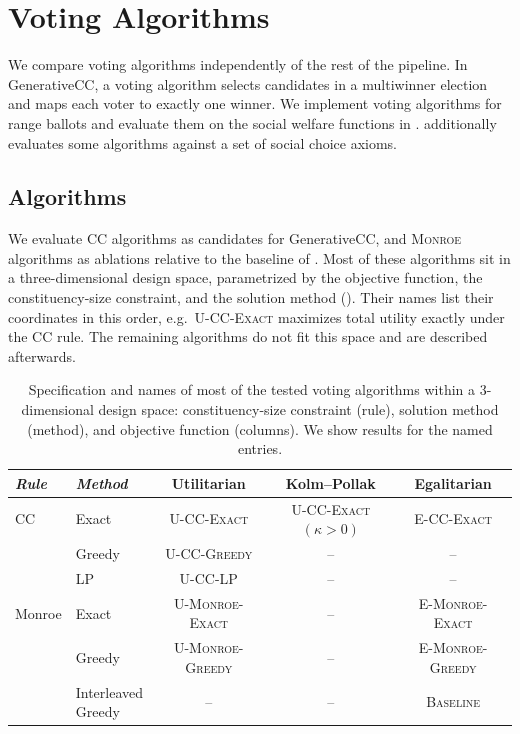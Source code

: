\documentclass[letterpaper]{article} %
\newcommand{\Exact}{\textsc{U-CC-Exact}}
\newcommand{\ExactP}{\textsc{U-CC-Exact}$(\kappa>0)$}
\newcommand{\Greedy}{\textsc{U-CC-Greedy}}
\newcommand{\LP}{\textsc{U-CC-LP}}
\newcommand{\ExactMonroe}{\textsc{U-Monroe-Exact}}
\newcommand{\EExactMonroe}{\textsc{E-Monroe-Exact}}
\newcommand{\Baseline}{\textsc{Baseline}}
\newcommand{\ECCExact}{\textsc{E-CC-Exact}}
\newcommand{\GreedyMonroe}{\textsc{E-Monroe-Greedy}}
\newcommand{\UGreedyMonroe}{\textsc{U-Monroe-Greedy}}
\begin{document}
\section{Voting Algorithms}
\label{sec:voting-algorithms}

We compare voting algorithms independently of the rest of the pipeline.
In GenerativeCC, a voting algorithm selects candidates in a multiwinner election and maps each voter to exactly one winner.
We implement voting algorithms for range ballots and evaluate them on the social welfare functions in .
 additionally evaluates some algorithms against a set of social choice axioms.

\subsection{Algorithms}
\label{sec:algorithms}

We evaluate \textsc{CC} algorithms as candidates for GenerativeCC, and \textsc{Monroe} algorithms as ablations relative to the baseline of \citet{fish-v2}.
Most of these algorithms sit in a three-dimensional design space, parametrized by the objective function, the constituency-size constraint, and the solution method ().
Their names list their coordinates in this order, e.g.\ \Exact{} maximizes total utility exactly under the CC rule.
The remaining algorithms do not fit this space and are described afterwards.

\begin{table}[t]
\centering
\begin{tabular}{ll|ccc}
\hline
\textit{Rule} & \textit{Method} & Utilitarian & Kolm--Pollak & Egalitarian \\
\hline
CC & Exact & \Exact{} & \ExactP{} & \ECCExact{} \\
 & Greedy & \Greedy{} & -- & -- \\
 & LP & \LP{} & -- & -- \\
\hline
Monroe & Exact & \ExactMonroe{} & -- & \EExactMonroe{} \\
 & Greedy & \UGreedyMonroe{} & -- & \GreedyMonroe{} \\[3pt]
 & \makecell[l]{Interleaved\\Greedy} & -- & -- & \Baseline{} \\[2pt]
\hline
\end{tabular}
\caption{Specification and names of most of the tested voting algorithms within a 3-dimensional design space: constituency-size constraint (rule), solution method (method), and objective function (columns). We show results for the named entries.}
\label{tab:algorithm-space}
\end{table}
\end{document}
